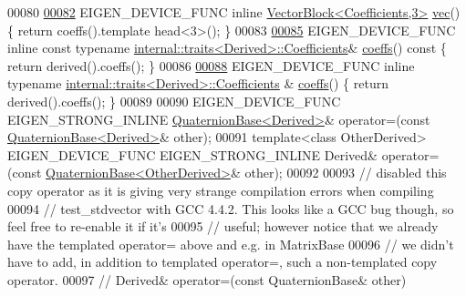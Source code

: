 \begin{DoxyCode}
00080 
\hyperlink{group___geometry___module_abc489fa38de6a3c22402101fa0e89342}{00082}   EIGEN\_DEVICE\_FUNC \textcolor{keyword}{inline} \hyperlink{group___core___module_class_eigen_1_1_vector_block}{VectorBlock<Coefficients,3>} 
      \hyperlink{group___geometry___module_abc489fa38de6a3c22402101fa0e89342}{vec}() \{ \textcolor{keywordflow}{return} coeffs().template head<3>(); \}
00083 
\hyperlink{group___geometry___module_aa7bb3fc337ffa82b0ad795783eb8a2ce}{00085}   EIGEN\_DEVICE\_FUNC \textcolor{keyword}{inline} \textcolor{keyword}{const} \textcolor{keyword}{typename} 
      \hyperlink{struct_eigen_1_1internal_1_1traits}{internal::traits<Derived>::Coefficients}& 
      \hyperlink{group___geometry___module_aa7bb3fc337ffa82b0ad795783eb8a2ce}{coeffs}()\textcolor{keyword}{ const }\{ \textcolor{keywordflow}{return} derived().coeffs(); \}
00086 
\hyperlink{group___geometry___module_afae737227fb9fb3f3c674cd1fccb4de0}{00088}   EIGEN\_DEVICE\_FUNC \textcolor{keyword}{inline} \textcolor{keyword}{typename} \hyperlink{struct_eigen_1_1internal_1_1traits}{internal::traits<Derived>::Coefficients}
      & \hyperlink{group___geometry___module_afae737227fb9fb3f3c674cd1fccb4de0}{coeffs}() \{ \textcolor{keywordflow}{return} derived().coeffs(); \}
00089 
00090   EIGEN\_DEVICE\_FUNC EIGEN\_STRONG\_INLINE \hyperlink{group___geometry___module_class_eigen_1_1_quaternion_base}{QuaternionBase<Derived>}& operator=(\textcolor{keyword}{const} 
      \hyperlink{group___geometry___module_class_eigen_1_1_quaternion_base}{QuaternionBase<Derived>}& other);
00091   \textcolor{keyword}{template}<\textcolor{keyword}{class} OtherDerived> EIGEN\_DEVICE\_FUNC EIGEN\_STRONG\_INLINE Derived& operator=(\textcolor{keyword}{const} 
      \hyperlink{group___geometry___module_class_eigen_1_1_quaternion_base}{QuaternionBase<OtherDerived>}& other);
00092 
00093 \textcolor{comment}{// disabled this copy operator as it is giving very strange compilation errors when compiling}
00094 \textcolor{comment}{// test\_stdvector with GCC 4.4.2. This looks like a GCC bug though, so feel free to re-enable it if it's}
00095 \textcolor{comment}{// useful; however notice that we already have the templated operator= above and e.g. in MatrixBase}
00096 \textcolor{comment}{// we didn't have to add, in addition to templated operator=, such a non-templated copy operator.}
00097 \textcolor{comment}{//  Derived& operator=(const QuaternionBase& other)}

\end{DoxyCode}
